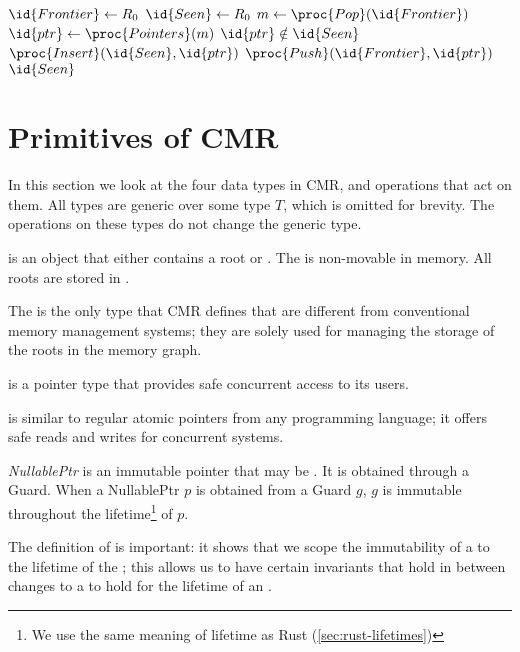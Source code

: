 \begin{codebox}
\li $\id{Frontier} \gets R_0$
\li $\id{Seen} \gets R_0$
\li \While $m \gets \proc{Pop}(\id{Frontier})$
\li   \Do \For $\id{ptr} \gets \proc{Pointers}(m)$
\li     \Do \If $\id{ptr} \notin \id{Seen}$
\li         \Do
            $\proc{Insert}(\id{Seen}, \id{ptr})$
\li	  		  $\proc{Push}(\id{Frontier}, \id{ptr})$
            \End
        \End
      \End
\li \Return $\id{Seen}$
\end{codebox}

\section{Primitives of CMR\label{sec:cmr-primitives}}

In this section we look at the four data types in CMR, and operations that act on them. All types
are generic over some type $T$, which is omitted for brevity. The operations on these types do not
change the generic type.

\begin{definition}
   is an object that either contains a root or \nullptr. The  is non-movable
  in memory. All roots are stored in .
\end{definition}

The  is the only type that CMR defines that are different from conventional memory
management systems; they are solely used for managing the storage of the roots in the memory graph.

\begin{definition}
   is a pointer type that provides safe concurrent access to its users.
\end{definition}

 is similar to regular atomic pointers from any programming language; it offers safe
reads and writes for concurrent systems.

\begin{definition}
  \emph{NullablePtr} is an immutable pointer that may be \nullptr. It is obtained through a Guard.
  When a NullablePtr $p$ is obtained from a Guard $g$, $g$ is immutable throughout the
  lifetime\footnote{We use the same meaning of lifetime as Rust (\cref{sec:rust-lifetimes})}
  of $p$.
\end{definition}

The definition of  is important: it shows that we scope the immutability of a
 to the lifetime of the ; this allows us to have certain invariants
that hold in between changes to a  to hold for the lifetime of an .

